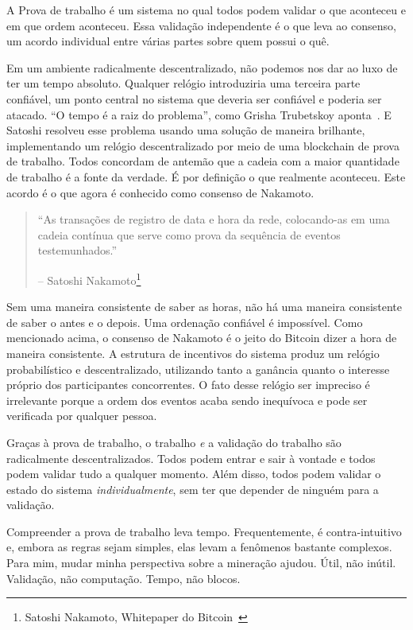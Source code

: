 A Prova de trabalho é um sistema no qual todos podem validar o que aconteceu e em que ordem aconteceu. Essa validação independente é o que leva ao consenso, um acordo individual entre várias partes sobre quem possui o quê.

Em um ambiente radicalmente descentralizado, não podemos nos dar ao luxo de ter um tempo absoluto. Qualquer relógio introduziria uma terceira parte confiável, um ponto central no sistema que deveria ser confiável e poderia ser atacado. \enquote{O tempo é a raiz do problema}, como Grisha Trubetskoy aponta~\cite{pow-clock}. E Satoshi resolveu esse problema usando uma solução de maneira brilhante, implementando um relógio descentralizado por meio de uma blockchain de prova de trabalho. Todos concordam de antemão que a cadeia com a maior quantidade de trabalho é a fonte da verdade. É por definição o que realmente aconteceu. Este acordo é o que agora é conhecido como consenso de Nakamoto.

\begin{quotation}\begin{samepage}
\enquote{As transações de registro de data e hora da rede, colocando-as em uma cadeia contínua que serve como prova da sequência de eventos testemunhados.}
\begin{flushright} -- Satoshi Nakamoto\footnote{Satoshi Nakamoto, Whitepaper do Bitcoin~\cite{whitepaper}}
\end{flushright}\end{samepage}\end{quotation}

Sem uma maneira consistente de saber as horas, não há uma maneira consistente de saber o antes e o depois. Uma ordenação confiável é impossível. Como mencionado acima, o consenso de Nakamoto é o jeito do Bitcoin dizer a hora de maneira consistente. A estrutura de incentivos do sistema produz um relógio probabilístico e descentralizado, utilizando tanto a ganância quanto o interesse próprio dos participantes concorrentes. O fato desse relógio ser impreciso é irrelevante porque a ordem dos eventos acaba sendo inequívoca e pode ser verificada por qualquer pessoa.

Graças à prova de trabalho, o trabalho \textit{e} a validação do trabalho são radicalmente descentralizados. Todos podem entrar e sair à vontade e todos podem validar tudo a qualquer momento. Além disso, todos podem validar o estado do sistema \textit{individualmente}, sem ter que depender de ninguém para a validação.

Compreender a prova de trabalho leva tempo. Frequentemente, é contra-intuitivo e, embora as regras sejam simples, elas levam a fenômenos bastante complexos. Para mim, mudar minha perspectiva sobre a mineração ajudou. Útil, não inútil. Validação, não computação. Tempo, não blocos.

